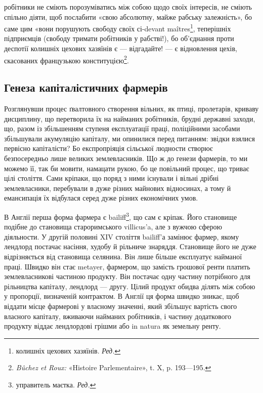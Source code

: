 \parcont{}  %
робітники не сміють порозуміватись між собою щодо своїх інтересів,
не сміють спільно діяти, щоб послабити «свою абсолютну,
майже рабську залежність», бо саме цим «вони порушують свободу
своїх сі-devant maîtres\footnote*{
колишніх цехових хазяїнів. \emph{Ред.}
}, теперішніх підприємців (свободу
тримати робітників у рабстві!), бо об’єднання проти деспотії
колишніх цехових хазяїнів є — відгадайте! — є відновлення цехів,
скасованих французькою конституцією\footnote{
\emph{Bûchez et Roux: } «Histoire Parlementaire», t. X, p. 193—195.
}.
\subsection{Генеза капіталістичних фармерів}
Розглянувши процес ґвалтовного створення вільних, як птиці,
пролетарів, криваву дисциплину, що перетворила їх на найманих
робітників, брудні державні заходи, що, разом із збільшенням
ступеня експлуатації праці, поліційними засобами збільшували
акумуляцію капіталу, ми опинилися перед питанням: звідки взялися
первісно капіталісти? Бо експропріяція сільської людности
створює безпосередньо лише великих землевласників. Що ж до
генези фармерів, то ми можемо її, так би мовити, намацати рукою,
бо це повільний процес, що триває цілі століття. Сами кріпаки,
що поряд з ними існували і вільні дрібні землевласники, перебували
в дуже різних майнових відносинах, а тому й емансипація
їх відбулася серед дуже різних економічних умов.

В Англії перша форма фармера є bailiff\footnote*{управитель маєтка. \emph{Ред.}
}, що сам є кріпак.
Його становище подібне до становища староримського villicus’a,
але з вужчою сферою діяльности. У другій половині XIV століття
bailiff’а замінює фармер, якому лендлорд постачає насіння,
худобу й рільниче знаряддя. Становище його не дуже відрізняється
від становища селянина. Він лише більше експлуатує
найманої праці. Швидко він стає metayer, фармером, що замість
грошової ренти платить землевласникові частиною продукту.
Він постачає одну частину потрібного для рільництва капіталу,
лендлорд — другу. Цілий продукт обидва ділять між собою у
пропорції, визначеній контрактом. В Англії ця форма швидко
зникає, щоб віддати місце фармерові у власному значенні, який
збільшує вартість свого власного капіталу, вживаючи найманих
робітників, і частину додаткового продукту віддає лендлордові
грішми або in natura як земельну ренту.

